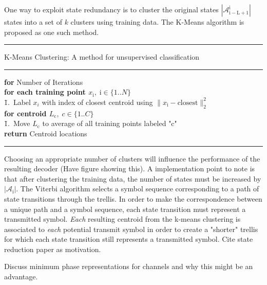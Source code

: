 \documentclass[12pt,a4paper]{report}
\begin{document}
One way to exploit state redundancy is to cluster the original states $|\mathcal{A}_{\mathrm{i-L+1}}^{\mathrm{i}}|$  states into a set of $k$ clusters using training data. The K-Means algorithm is proposed as one such method.
\\

    \noindent\rule[16pt]{\textwidth}{0.6pt}
K-Means Clustering: A method for unsupervised classification

    \noindent\rule[10pt]{\textwidth}{0.4pt}
    {\footnotesize
    \begin{tabbing}
        {\textbf{for} Number of Iterations}\\
         \qquad \= {\bf for each training point $x_{\mathrm{i}}, \;\mathrm{i}  \in \{1..N\}$}\\
        \qquad \qquad \= 1.\ Label $x_i$ with index of closest centroid using $\|x_{\mathrm{i}}- \text{closest}\|^2_2$ \\
        \qquad \= {\bf for centroid $L_{\mathrm{c}}, \;c \in \{1..C\}$}\\
                \qquad \qquad \= 1.\ Move $L_{\mathrm{c}}$ to average of all training points labeled "c"\\


        {\bf return} Centroid locations
    \end{tabbing}}
    \noindent\rule[10pt]{\textwidth}{0.4pt}
    
Choosing an appropriate number of clusters will influence the performance of the resulting decoder (Have figure showing this).
A implementation point to note is that after clustering the training data, the number of states must be increased by $|\mathcal{A}_{\mathrm{i}}|$. The Viterbi algorithm selects a symbol sequence corresponding to a path of state transitions through the trellis. In order to make the correspondence between a unique path and a symbol sequence, each state transition must represent a transmitted symbol. \emph{Each} resulting centroid from the k-means clustering is associated to \emph{each} potential transmit symbol in order to create a "shorter" trellis for which each state transition still represents a transmitted symbol. 
Cite state reduction paper as motivation. 

Discuss minimum phase representations for channels and why this might be an advantage. 
\end{document}
